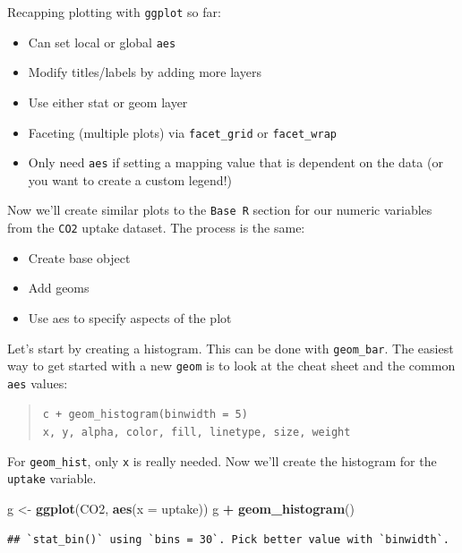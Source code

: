 \documentclass[
]{book}
\newenvironment{Shaded}{\begin{snugshade}}{\end{snugshade}}
\newcommand{\DataTypeTok}[1]{\textcolor[rgb]{0.13,0.29,0.53}{#1}}
\newcommand{\KeywordTok}[1]{\textcolor[rgb]{0.13,0.29,0.53}{\textbf{#1}}}
\newcommand{\NormalTok}[1]{#1}
\newcommand{\OperatorTok}[1]{\textcolor[rgb]{0.81,0.36,0.00}{\textbf{#1}}}
\newcommand{\StringTok}[1]{\textcolor[rgb]{0.31,0.60,0.02}{#1}}
\providecommand{\tightlist}{%
  \setlength{\itemsep}{0pt}\setlength{\parskip}{0pt}}
\theoremstyle{definition}
\theoremstyle{definition}
\theoremstyle{definition}
\theoremstyle{remark}
\begin{document}
Recapping plotting with \texttt{ggplot} so far:

\begin{itemize}
\item
  Can set local or global \texttt{aes}
\item
  Modify titles/labels by adding more layers
\item
  Use either stat or geom layer
\item
  Faceting (multiple plots) via \texttt{facet\_grid} or \texttt{facet\_wrap}
\item
  Only need \texttt{aes} if setting a mapping value that is dependent on the data (or you want to create a custom legend!)
\end{itemize}

Now we'll create similar plots to the \texttt{Base\ R} section for our numeric variables from the \texttt{CO2} uptake dataset. The process is the same:

\begin{itemize}
\tightlist
\item
  Create base object\\
\item
  Add geoms\\
\item
  Use aes to specify aspects of the plot
\end{itemize}

Let's start by creating a histogram. This can be done with \texttt{geom\_bar}. The easiest way to get started with a new \texttt{geom} is to look at the cheat sheet and the common \texttt{aes} values:

\begin{quote}
\texttt{c\ +\ geom\_histogram(binwidth\ =\ 5)}
\texttt{x,\ y,\ alpha,\ color,\ fill,\ linetype,\ size,\ weight}
\end{quote}

For \texttt{geom\_hist}, only \texttt{x} is really needed. Now we'll create the histogram for the \texttt{uptake} variable.

\begin{Shaded}
\begin{Highlighting}[]
\NormalTok{g <-}\StringTok{ }\KeywordTok{ggplot}\NormalTok{(CO2, }\KeywordTok{aes}\NormalTok{(}\DataTypeTok{x =}\NormalTok{ uptake))}
\NormalTok{g }\OperatorTok{+}\StringTok{ }\KeywordTok{geom_histogram}\NormalTok{()}
\end{Highlighting}
\end{Shaded}

\begin{verbatim}
## `stat_bin()` using `bins = 30`. Pick better value with `binwidth`.
\end{verbatim}
\end{document}
